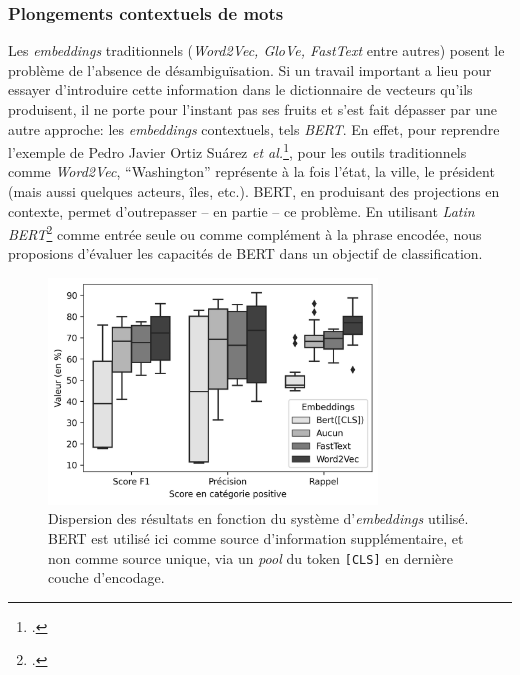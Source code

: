 \subsubsection{Plongements contextuels de mots}

Les \textit{embeddings} traditionnels (\textit{Word2Vec, GloVe, FastText} entre autres) posent le problème de l'absence de désambiguïsation. Si un travail important a lieu pour essayer d'introduire cette information dans le dictionnaire de vecteurs qu'ils produisent, il ne porte pour l'instant pas ses fruits et s'est fait dépasser par une autre approche: les \textit{embeddings} contextuels, tels \textit{BERT}. En effet, pour reprendre l'exemple de Pedro Javier Ortiz Suárez \textit{et al.}\footcite{ortizsuarez:hal02148693}, pour les outils traditionnels comme \textit{Word2Vec}, \enquote{Washington} représente à la fois l'état, la ville, le président (mais aussi quelques acteurs, îles, etc.). BERT, en produisant des projections en contexte, permet d'outrepasser -- en partie -- ce problème. En utilisant \textit{Latin BERT}\footcite{bamman2020latin} comme entrée seule ou comme complément à la phrase encodée, nous proposions d'évaluer les capacités de BERT dans un objectif de classification.

\begin{figure}[t]
    \centering
    \includegraphics[height=6cm]{figures/chap4/scoreDispersionEmbeddings.png}
    \caption{Dispersion des résultats en fonction du système d'\textit{embeddings} utilisé. BERT est utilisé ici comme source  d'information supplémentaire, et non comme source unique, via un \textit{pool} du token \texttt{[CLS]} en dernière couche d'encodage.}
    \label{fig:chap4:bert-dispersion-fusion}
\end{figure}

